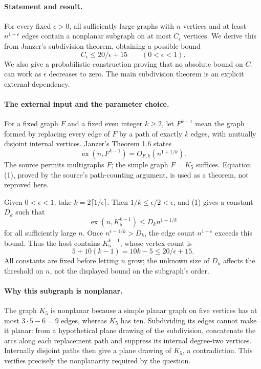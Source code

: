 \paragraph{Statement and result.}
For every fixed \(\epsilon>0\), all sufficiently large graphs with \(n\) vertices and at least \(n^{1+\epsilon}\) edges contain a nonplanar subgraph on at most \(C_\epsilon\) vertices. We derive this from Janzer's subdivision theorem, obtaining a possible bound
\[
 C_\epsilon\leq 20/\epsilon+15\qquad(0<\epsilon<1).
\]
We also give a probabilistic construction proving that no absolute bound on \(C_\epsilon\) can work as \(\epsilon\) decreases to zero. The main subdivision theorem is an explicit external dependency.

\paragraph{The external input and the parameter choice.}
For a fixed graph \(F\) and a fixed even integer \(k\geq2\), let \(F^{k-1}\) mean the graph formed by replacing every edge of \(F\) by a path of exactly \(k\) edges, with mutually disjoint internal vertices. Janzer's Theorem 1.6 states
\[
 \operatorname{ex}(n,F^{k-1})=O_{F,k}(n^{1+1/k}).
\tag{1}
\]
The source permits multigraphs \(F\); the simple graph \(F=K_5\) suffices. Equation (1), proved by the source's path-counting argument, is used as a theorem, not reproved here.

Given \(0<\epsilon<1\), take \(k=2\lceil1/\epsilon\rceil\). Then \(1/k\leq\epsilon/2<\epsilon\), and (1) gives a constant \(D_k\) such that
\[
 \operatorname{ex}(n,K_5^{k-1})\leq D_k n^{1+1/k}
\]
for all sufficiently large \(n\). Once \(n^{\epsilon-1/k}>D_k\), the edge count \(n^{1+\epsilon}\) exceeds this bound. Thus the host contains \(K_5^{k-1}\), whose vertex count is
\[
 5+10(k-1)=10k-5\leq20/\epsilon+15.
\]
All constants are fixed before letting \(n\) grow; the unknown size of \(D_k\) affects the threshold on \(n\), not the displayed bound on the subgraph's order.

\paragraph{Why this subgraph is nonplanar.}
The graph \(K_5\) is nonplanar because a simple planar graph on five vertices has at most \(3\cdot5-6=9\) edges, whereas \(K_5\) has ten. Subdividing its edges cannot make it planar: from a hypothetical plane drawing of the subdivision, concatenate the arcs along each replacement path and suppress its internal degree-two vertices. Internally disjoint paths then give a plane drawing of \(K_5\), a contradiction. This verifies precisely the nonplanarity required by the question.

